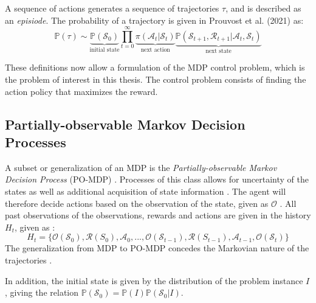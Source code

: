  
A sequence of actions generates a sequence of trajectories $\tau$, and is described as an \textit{episiode}. The probability of a trajectory is given in Prouvost et al. (2021) \cite{prouvost2020ecole} as:
\begin{equation}
    \mathbb{P}(\tau) \sim \underbrace{\mathbb{P}(\mathcal{S}_0)}_{\text{initial state}}
\prod_{t=0}^\infty \underbrace{\pi(\mathcal{A}_t | \mathcal{S}_t)}_{\text{next action}}
\underbrace{\mathbb{P}(\mathcal{S}_{t+1}, \mathcal{R}_{t+1} | \mathcal{A}_t, \mathcal{S}_t)}_{\text{next state}}
\end{equation}

These definitions now allow a formulation of the \gls{MDP} control problem, which is the problem of interest in this thesis. The control problem consists of finding the action policy that maximizes the reward. %



\subsection{Partially-observable Markov Decision Processes}

A subset or generalization of an \gls{MDP} is the \textit{Partially-observable Markov Decision Process }(\gls{PO-MDP}) \cite{monahan1982state}. Processes of this class allows for uncertainty of the states as well as additional acquisition of state information \cite{monahan1982state}. The agent will therefore decide actions based on the observation of the state, given as $\mathcal{O}$ \cite{prouvost2021ecole}. All past observations of the observations, rewards and actions are given in the history $H_t$, given as \cite{prouvost2021ecole}:
\begin{equation}
    H_t = \{\mathcal{O}(\mathcal{S}_0), \mathcal{R}(S_0), \mathcal{A}_0, ..., \mathcal{O}(\mathcal{S}_{t-1}), \mathcal{R}(S_{t-1}), \mathcal{A}_{t-1}, \mathcal{O}(\mathcal{S}_t)\}
\end{equation}
The generalization from \gls{MDP} to \gls{PO-MDP} concedes the Markovian nature of the trajectories \cite{prouvost2020ecole}.

In addition, the initial state is given by the distribution of the problem instance $I$, giving the relation $\mathbb{P}(\mathcal{S}_0) = \mathbb{P}(I) \mathbb{P}(\mathcal{S}_0 | I)  $\cite{prouvost2021ecole}. 


